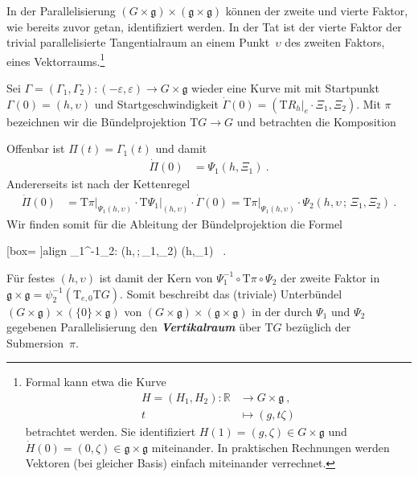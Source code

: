 \documentclass[10pt,a4paper]{article}
\newcommand*\resultbox[1]{%
  \colorbox{yaleblue!10}{\hspace{1em}#1\hspace{1em}}}
\theoremstyle{mytheorem}
\theoremstyle{mydefinition}
\newcommand{\mydef}[1]{\textbf{\textit{#1}}}
\newcommand{\Tt}{\mathrm{T}}
\begin{document}
In der Parallelisierung $(G\times\mathfrak{g})\times(\mathfrak{g}\times\mathfrak{g})$ können der zweite und vierte Faktor, wie bereits zuvor getan, identifiziert werden.
In der Tat ist der vierte Faktor der trivial parallelisierte Tangentialraum an einem Punkt~$\upsilon$ des zweiten Faktors, eines Vektorraums.\footnote{
	Formal kann etwa die Kurve 
\begin{align*}
	H=(H_1,H_2): \mathbb{R} &\rightarrow G\times\mathfrak{g}
	\ ,\nonumber\\
	t&\mapsto(g, t\zeta)
\end{align*}
betrachtet werden.
Sie identifiziert $H(1)=(g,\zeta)\in G\times\mathfrak{g}$ und $\dot{H}(0)=(0,\zeta)\in\mathfrak{g}\times\mathfrak{g}$ miteinander.
In praktischen Rechnungen werden Vektoren (bei gleicher Basis) einfach miteinander verrechnet.
}

Sei $\Gamma=(\Gamma_1,\Gamma_2):(-\varepsilon,\varepsilon)\rightarrow G\times\mathfrak{g}$ wieder eine Kurve mit mit Startpunkt $\Gamma(0)=(h,\upsilon)$ und Startgeschwindigkeit $\dot{\Gamma}(0)=(\Tt R_h|_e\cdot\Xi_1,\Xi_2)$.
Mit $\pi$ bezeichnen wir die Bündelprojektion $\Tt G\rightarrow G$ und betrachten die Komposition
\begin{center}
\end{center}
Offenbar ist $\Pi(t)=\Gamma_1(t)$ und damit
\begin{align*}
	\dot{\Pi}(0)
	&= \Psi_1(h,\Xi_1)
	\ .
\end{align*}
Andererseits ist nach der Kettenregel
\begin{align*}
	\dot{\Pi}(0)
	&= 
	\Tt\pi
	\big|_{\Psi_1(h,\upsilon)}
	\cdot
	\Tt\Psi_1
	\big|_{(h,\upsilon)}
	\cdot
	\dot{\Gamma}(0)
	= \Tt\pi
	\big|_{\Psi_1(h,\upsilon)}
	\cdot
	\Psi_2(h,\upsilon\,;\,\Xi_1,\Xi_2)
	\ .
\end{align*}
Wir finden somit für die Ableitung der Bündelprojektion die Formel
\begin{empheq}[box=\resultbox]{align}
	\Psi_1^{-1}\circ\Tt\pi\circ\Psi_2:
	(h,\upsilon\,;\,\Xi_1,\Xi_2) \mapsto (h,\Xi_1)
	\ .
\end{empheq}
Für festes $(h,\upsilon)$ ist damit der Kern von $\Psi_1^{-1}\circ\Tt\pi\circ\Psi_2$ der zweite Faktor in $\mathfrak{g}\times\mathfrak{g}=\psi_2^{-1}(\Tt_{e,0}\Tt G)$.
Somit beschreibt das (triviale) Unterbündel $(G\times\mathfrak{g})\times(\{0\}\times\mathfrak{g})$ von $(G\times\mathfrak{g})\times(\mathfrak{g}\times\mathfrak{g})$ in der durch $\Psi_1$ und $\Psi_2$ gegebenen Parallelisierung den \mydef{Vertikalraum} über $\Tt G$ bezüglich der Submersion~$\pi$.
\end{document}
